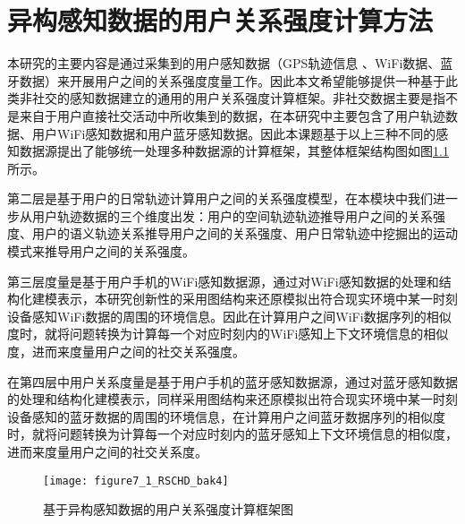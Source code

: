 \chapter{异构感知数据的用户关系强度计算方法}
\label{chap:chapter04}
本研究的主要内容是通过采集到的用户感知数据（GPS轨迹信息 、WiFi数据、蓝牙数据）来开展用户之间的关系强度度量工作。因此本文希望能够提供一种基于此类非社交的感知数据建立的通用的用户关系强度计算框架。非社交数据主要是指不是来自于用户直接社交活动中所收集到的数据，在本研究中主要包含了用户轨迹数据、用户WiFi感知数据和用户蓝牙感知数据。因此本课题基于以上三种不同的感知数据源提出了能够统一处理多种数据源的计算框架，其整体框架结构图如图\ref{fig:7_1}所示。
\par 第二层是基于用户的日常轨迹计算用户之间的关系强度模型，在本模块中我们进一步从用户轨迹数据的三个维度出发：用户的空间轨迹轨迹推导用户之间的关系强度、用户的语义轨迹关系推导用户之间的关系强度、用户日常轨迹中挖掘出的运动模式来推导用户之间的关系强度。
\par 第三层度量是基于用户手机的WiFi感知数据源，通过对WiFi感知数据的处理和结构化建模表示，本研究创新性的采用图结构来还原模拟出符合现实环境中某一时刻设备感知WiFi数据的周围的环境信息。因此在计算用户之间WiFi数据序列的相似度时，就将问题转换为计算每一个对应时刻内的WiFi感知上下文环境信息的相似度，进而来度量用户之间的社交关系强度。
\par 在第四层中用户关系度量是基于用户手机的蓝牙感知数据源，通过对蓝牙感知数据的处理和结构化建模表示，同样采用图结构来还原模拟出符合现实环境中某一时刻设备感知的蓝牙数据的周围的环境信息，在计算用户之间蓝牙数据序列的相似度时，就将问题转换为计算每一个对应时刻内的蓝牙感知上下文环境信息的相似度，进而来度量用户之间的社交关系度。
\begin{figure}[htp]
\centering
\texttt{[image: figure7\_1\_RSCHD\_bak4]}
\caption{基于异构感知数据的用户关系强度计算框架图}
\label{fig:7_1}
\end{figure}

